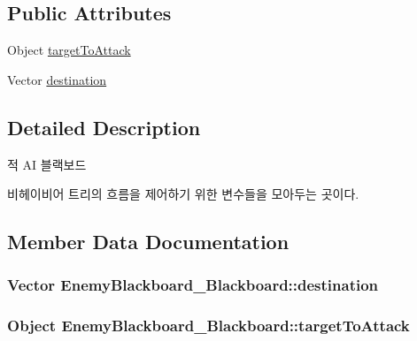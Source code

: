 \subsection*{Public Attributes}
\begin{DoxyCompactItemize}
\item 
Object \hyperlink{class_enemy_blackboard___blackboard_a4f1aa5731e916e3a132ab92d54175fb0}{target\+To\+Attack}
\item 
Vector \hyperlink{class_enemy_blackboard___blackboard_a401468bdb3fb40085e8eb2467a33da49}{destination}
\end{DoxyCompactItemize}


\subsection{Detailed Description}
적 AI 블랙보드 

비헤이비어 트리의 흐름을 제어하기 위한 변수들을 모아두는 곳이다. 

\subsection{Member Data Documentation}
\subsubsection[{\texorpdfstring{destination}{destination}}]{\setlength{\rightskip}{0pt plus 5cm}Vector Enemy\+Blackboard\+\_\+\+Blackboard\+::destination}\hypertarget{class_enemy_blackboard___blackboard_a401468bdb3fb40085e8eb2467a33da49}{}\label{class_enemy_blackboard___blackboard_a401468bdb3fb40085e8eb2467a33da49}
\subsubsection[{\texorpdfstring{target\+To\+Attack}{targetToAttack}}]{\setlength{\rightskip}{0pt plus 5cm}Object Enemy\+Blackboard\+\_\+\+Blackboard\+::target\+To\+Attack}\hypertarget{class_enemy_blackboard___blackboard_a4f1aa5731e916e3a132ab92d54175fb0}{}\label{class_enemy_blackboard___blackboard_a4f1aa5731e916e3a132ab92d54175fb0}
